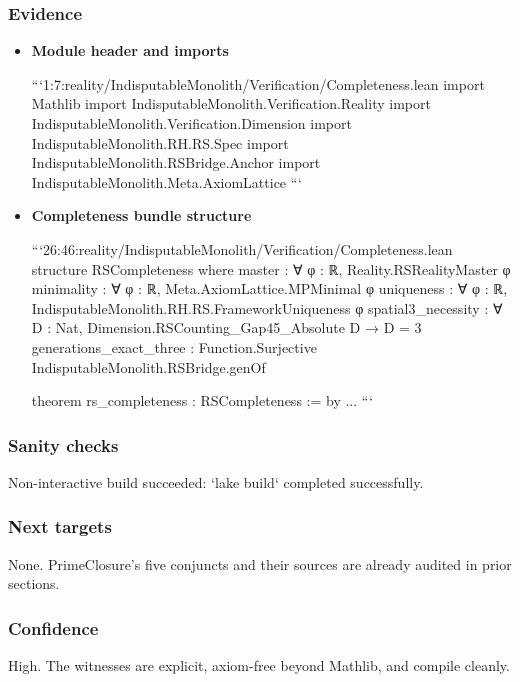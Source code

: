 \documentclass{article}
\begin{document}
\subsubsection{Evidence}
\begin{itemize}[leftmargin=*]
  \item \textbf{Module header and imports}

```1:7:reality/IndisputableMonolith/Verification/Completeness.lean
import Mathlib
import IndisputableMonolith.Verification.Reality
import IndisputableMonolith.Verification.Dimension
import IndisputableMonolith.RH.RS.Spec
import IndisputableMonolith.RSBridge.Anchor
import IndisputableMonolith.Meta.AxiomLattice
```

  \item \textbf{Completeness bundle structure}

```26:46:reality/IndisputableMonolith/Verification/Completeness.lean
structure RSCompleteness where
  master                  : ∀ φ : ℝ, Reality.RSRealityMaster φ
  minimality              : ∀ φ : ℝ, Meta.AxiomLattice.MPMinimal φ
  uniqueness              : ∀ φ : ℝ, IndisputableMonolith.RH.RS.FrameworkUniqueness φ
  spatial3_necessity      : ∀ D : Nat, Dimension.RSCounting_Gap45_Absolute D → D = 3
  generations_exact_three : Function.Surjective IndisputableMonolith.RSBridge.genOf

theorem rs_completeness : RSCompleteness := by
  ...
```
\end{itemize}

\subsubsection{Sanity checks}
Non-interactive build succeeded: `lake build` completed successfully.

\subsubsection{Next targets}
None. PrimeClosure's five conjuncts and their sources are already audited in prior sections.

\subsubsection{Confidence}
High. The witnesses are explicit, axiom-free beyond Mathlib, and compile cleanly.

\end{document}
